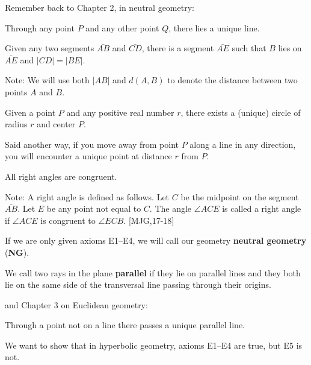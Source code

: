 \documentclass[newpage,hints,handout]{ximera}
\begin{document}
Remember back to Chapter 2, in neutral geometry: 
\begin{axiom}[E1]
Through any point $P$ and any other point $Q$, there lies a unique
line.
\end{axiom}

\begin{axiom}[E2] 
Given any two segments $\bar{AB}$ and $\bar{CD}$, there is a
segment $\bar{AE}$ such that $B$ lies on $\bar{AE}$ and
$\left\vert CD\right\vert =\left\vert BE\right\vert$.

Note: We will use both $\left\vert AB\right\vert$ and $d(A,B)$ to
denote the distance between two points $A$ and $B$.
\end{axiom}

\begin{axiom}[E3]
Given a point $P$ and any positive real number $r$, there exists a
(unique) circle of radius $r$ and center $P$. 

Said another way, if you move away from point $P$ along a line in any
direction, you will encounter a unique point at distance $r$ from $P$.
\end{axiom}

\begin{axiom}[E4]
All right angles are congruent.

Note: A right angle is defined as follows. Let $C$ be the midpoint on
the segment $\bar{AB}$. Let $E$ be any point not equal to
$C$. The angle $\angle ACE$ is called a right angle if $\angle ACE$ is
congruent to $\angle ECB$. [MJG,17-18]
\end{axiom}

\begin{definition}
If we are only given axioms E1--E4, we will call our
geometry \textbf{neutral geometry} (\textbf{NG}).
\end{definition}

\begin{definition}
We call two rays in the plane \textbf{parallel} if they lie on
parallel lines and they both lie on the same side of the transversal
line passing through their origins.
\end{definition}

and Chapter 3 on Euclidean geometry:
\begin{axiom}[E5]
Through a point not on a line there passes a unique parallel line.
\end{axiom}

We want to show that in hyperbolic geometry, axioms E1--E4 are true, but E5 is not.
\end{document}
